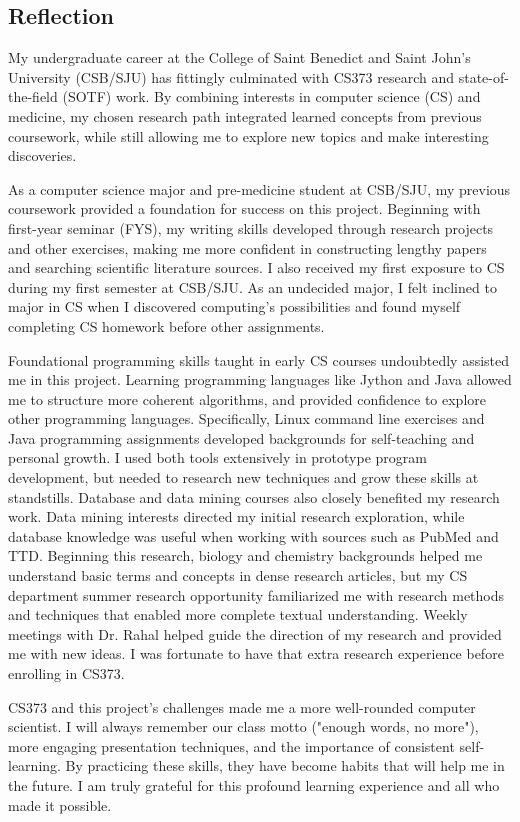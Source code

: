 \documentclass{IEEEtran}
\begin{document}


\appendix
\subsection{Reflection}
My undergraduate career at the College of Saint Benedict and Saint John's University (CSB/SJU) has fittingly culminated with CS373 research and state-of-the-field (SOTF) work.  By combining interests in computer science (CS) and medicine, my chosen research path integrated learned concepts from previous coursework, while still allowing me to explore new topics and make interesting discoveries.  

As a computer science major and pre-medicine student at CSB/SJU, my previous coursework provided a foundation for success on this project.  Beginning with first-year seminar (FYS), my writing skills developed through research projects and other exercises, making me more confident in constructing lengthy papers and searching scientific literature sources.  I also received my first exposure to CS during my first semester at CSB/SJU.  As an undecided major, I felt inclined to major in CS when I discovered computing's possibilities and found myself completing CS homework before other assignments. 

Foundational programming skills taught in early CS courses undoubtedly assisted me in this project.  Learning programming languages like Jython and Java allowed me to structure more coherent algorithms, and provided confidence to explore other programming languages.  Specifically, Linux command line exercises and Java programming assignments developed backgrounds for self-teaching and personal growth. I used both tools extensively in prototype program development, but needed to research new techniques and grow these skills at standstills. Database and data mining courses also closely benefited my research work.  Data mining interests directed my initial research exploration, while database knowledge was useful when working with sources such as PubMed and TTD.  Beginning this research, biology and chemistry backgrounds helped me understand basic terms and concepts in dense research articles, but my CS department summer research opportunity familiarized me with research methods and techniques that enabled more complete textual understanding.  Weekly meetings with  Dr. Rahal helped guide the direction of my research and provided me with new ideas.  I was fortunate to have that extra research experience before enrolling in CS373.

CS373 and this project's challenges made me a more well-rounded computer scientist.  I will always remember our class motto ("enough words, no more"), more engaging presentation techniques, and the importance of consistent self-learning.  By practicing these skills, they have become habits that will help me in the future.  I am truly grateful for this profound learning experience and all who made it possible. 
\end{document}

